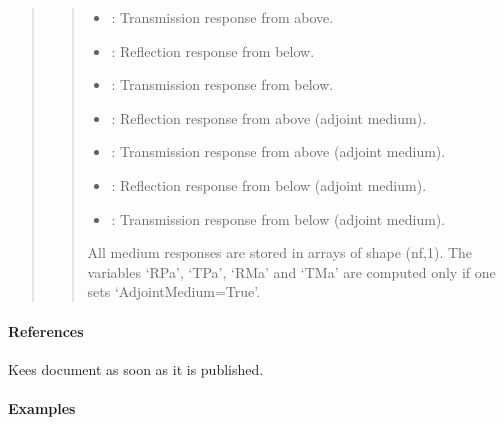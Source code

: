 \documentclass[letterpaper,10pt,english]{sphinxmanual}
\begin{document}
\begin{fulllineitems}
\begin{fulllineitems}
\begin{quote}
\begin{description}
\begin{quote}
\begin{description}
\begin{itemize}
\item {} 
: Transmission response from above.

\item {} 
: Reflection response from below.

\item {} 
: Transmission response from below.

\item {} 
: Reflection response from above (adjoint medium).

\item {} 
: Transmission response from above (adjoint medium).

\item {} 
: Reflection response from below (adjoint medium).

\item {} 
: Transmission response from below (adjoint medium).

\end{itemize}

\end{description}

All medium responses are stored in arrays of shape (nf,1). The variables ‘RPa’, ‘TPa’, ‘RMa’ and ‘TMa’ are computed only if one sets ‘AdjointMedium=True’.
\end{quote}

\end{description}\end{quote}
\paragraph{References}

Kees document as soon as it is published.
\paragraph{Examples}

%
\begin{sphinxVerbatim}[commandchars=\\\{\}]
     
   
\end{sphinxVerbatim}


\end{fulllineitems}
\end{fulllineitems}
\end{document}
